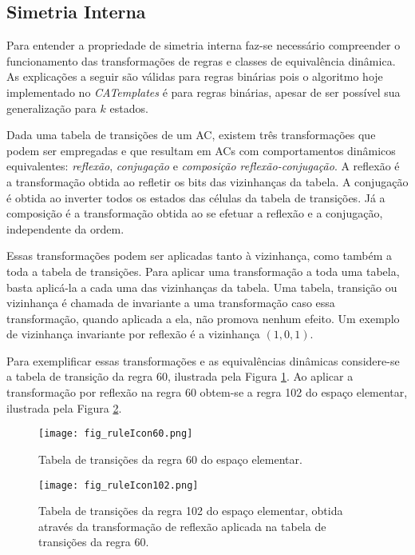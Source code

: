 \subsection{Simetria Interna}
Para entender a propriedade de simetria interna faz-se necessário compreender o funcionamento das transformações de regras e classes de equivalência dinâmica. As explicações a seguir são válidas para regras binárias pois o algoritmo hoje implementado no \textit{CATemplates} é para regras binárias, apesar de ser possível sua generalização para $k$ estados.

Dada uma tabela de transições de um AC, existem três transformações que podem ser empregadas e que resultam em ACs com comportamentos dinâmicos equivalentes: \textit{reflexão}, \textit{conjugação} e \textit{composição reflexão-conjugação}. A reflexão é a transformação obtida ao refletir os bits das vizinhanças da tabela. A conjugação é obtida ao inverter todos os estados das células da tabela de transições. Já a composição é a transformação obtida ao se efetuar a reflexão e a conjugação, independente da ordem.

Essas transformações podem ser aplicadas tanto à vizinhança, como também a toda a tabela de transições. Para aplicar uma transformação a toda uma tabela, basta aplicá-la a cada uma das vizinhanças da tabela. Uma tabela, transição ou vizinhança é chamada de invariante a uma transformação caso essa transformação, quando aplicada a ela, não promova nenhum efeito. Um exemplo de vizinhança invariante por reflexão é a vizinhança $(1,0,1)$.

Para exemplificar essas transformações e as equivalências dinâmicas considere-se a tabela de transição da regra 60, ilustrada pela Figura \ref{fig:table60}. Ao aplicar a transformação por reflexão na regra 60 obtem-se a regra 102 do espaço elementar, ilustrada pela Figura \ref{fig:table102}.

	\begin{figure}[h!]
	  \centering
	  \texttt{[image: fig\_ruleIcon60.png]}
	  \caption{Tabela de transições da regra 60 do espaço elementar.}
	  \label{fig:table60}
	\end{figure}

	\begin{figure}[h!]
	  \centering
	  \texttt{[image: fig\_ruleIcon102.png]}
	  \caption{Tabela de transições da regra 102 do espaço elementar, obtida através da transformação de reflexão aplicada na tabela de transições da regra 60.}
	  \label{fig:table102}
	\end{figure}

